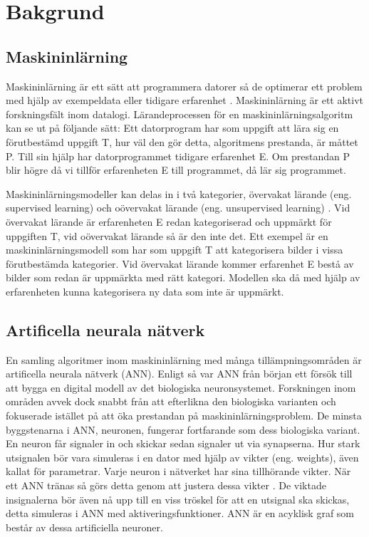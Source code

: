 \documentclass[]{kththesis}
\begin{document}
\chapter{Bakgrund}

\section{Maskininlärning}
Maskininlärning är ett sätt att programmera datorer så de optimerar ett problem med hjälp av exempeldata eller tidigare erfarenhet \parencite{alpaydin2009introduction}. Maskininlärning är ett aktivt forskningsfält inom datalogi. Lärandeprocessen för en maskininlärningsalgoritm kan se ut på följande sätt: Ett datorprogram har som uppgift att lära sig en förutbestämd uppgift T, hur väl den gör detta, algoritmens prestanda, är måttet P. Till sin hjälp har datorprogrammet tidigare erfarenhet E. Om prestandan P blir högre då vi tillför erfarenheten E till programmet, då lär sig programmet.

Maskininlärningsmodeller kan delas in i två kategorier, övervakat lärande (eng. supervised learning) och oövervakat lärande (eng. unsupervised learning) \parencite{murphy2012machine}. Vid övervakat lärande är erfarenheten E redan kategoriserad och uppmärkt för uppgiften T, vid oövervakat lärande så är den inte det. Ett exempel är en maskininlärningsmodell som har som uppgift T att kategorisera bilder i vissa förutbestämda kategorier. Vid övervakat lärande kommer erfarenhet E bestå av bilder som redan är uppmärkta med rätt kategori. Modellen ska då med hjälp av erfarenheten kunna kategorisera ny data som inte är uppmärkt. 

\section{Artificella neurala nätverk}
En samling algoritmer inom maskininlärning med många tillämpningsområden är artificella neurala nätverk (ANN). Enligt \textcite{Goodfellow-et-al-2016} så var ANN från början ett försök till att bygga en digital modell av det biologiska neuronsystemet. Forskningen inom områden avvek dock snabbt från att efterlikna den biologiska varianten och fokuserade istället på att öka prestandan på maskininlärningsproblem. De minsta byggstenarna i ANN, neuronen, fungerar fortfarande som dess biologiska variant. En neuron får signaler in och skickar sedan signaler ut via synapserna. Hur stark utsignalen bör vara simuleras i en dator med hjälp av vikter (eng. weights), även kallat för parametrar. Varje neuron i nätverket har sina tillhörande vikter. När ett ANN tränas så görs detta genom att justera dessa vikter \parencite{Goodfellow-et-al-2016}. De viktade insignalerna bör även nå upp till en viss tröskel för att en utsignal ska skickas, detta simuleras i ANN med aktiveringsfunktioner. ANN är en acyklisk graf som består av dessa artificiella neuroner.
\end{document}
